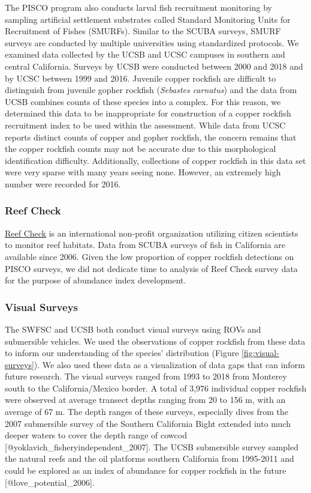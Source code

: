 \documentclass[11pt,
  letterpaper,
]{article}
\begin{document}
The PISCO program also conducts larval fish recruitment monitoring by sampling artificial settlement substrates called Standard Monitoring Units for Recruitment of Fishes (SMURFs). Similar to the SCUBA surveys, SMURF surveys are conducted by multiple universities using standardized protocols. We examined data collected by the UCSB and UCSC campuses in southern and central California. Surveys by UCSB were conducted between 2000 and 2018 and by UCSC between 1999 and 2016. Juvenile copper rockfish are difficult to distinguish from juvenile gopher rockfish (\emph{Sebastes carnatus}) and the data from UCSB combines counts of these species into a complex. For this reason, we determined this data to be inappropriate for construction of a copper rockfish recruitment index to be used within the assessment. While data from UCSC reports distinct counts of copper and gopher rockfish, the concern remains that the copper rockfish counts may not be accurate due to this morphological identification difficulty. Additionally, collections of copper rockfish in this data set were very sparse with many years seeing none. However, an extremely high number were recorded for 2016.

\subsubsection{Reef Check}\label{reef-check}

\href{https://www.reefcheck.org/}{Reef Check} is an international non-profit organization utilizing citizen scientists to monitor reef habitats. Data from SCUBA surveys of fish in California are available since 2006. Given the low proportion of copper rockfish detections on PISCO surveys, we did not dedicate time to analysis of Reef Check survey data for the purpose of abundance index development.

\subsubsection{Visual Surveys}\label{visual-surveys}

The SWFSC and UCSB both conduct visual surveys using ROVs and submersible vehicles. We used the observations of copper rockfish from these data to inform our understanding of the species' distribution (Figure \ref{fig:visual-surveys}). We also used these data as a visualization of data gaps that can inform future research. The visual surveys ranged from 1993 to 2018 from Monterey south to the California/Mexico border. A total of 3,976 individual copper rockfish were observed at average transect depths ranging from 20 to 156 m, with an average of 67 m. The depth ranges of these surveys, especially dives from the 2007 submersible survey of the Southern California Bight extended into much deeper waters to cover the depth range of cowcod {[}@yoklavich\_fisheryindependent\_2007{]}. The UCSB submersible survey sampled the natural reefs and the oil platforms southern California from 1995-2011 and could be explored as an index of abundance for copper rockfish in the future {[}@love\_potential\_2006{]}.
\end{document}
